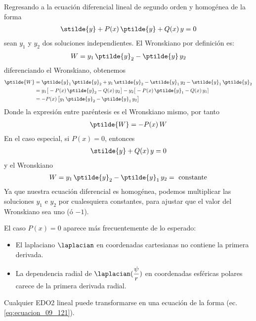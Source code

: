 Regresando a la ecuación diferencial lineal de segundo orden y homogénea de la forma
\begin{align}
\stilde{y} + P(x) \, \ptilde{y} + Q(x) \, y = 0
\label{eq:ecuacion_09_118}
\end{align}
sean $y_{1}$ y $y_{2}$ dos soluciones independientes. El Wronskiano por definición es:
\begin{align}
W = y_{1} \, \ptilde{y}_{2} - \ptilde{y} \, y_{2}
\label{eq:ecuacion_09_119}
\end{align}
diferenciando el Wronskiano, obtenemos
\begin{align*}
\ptilde{W} &= \ptilde{y}_{1} \, \ptilde{y}_{2} + y_{1} \, \stilde{y}_{2} - \stilde{y}_{1} \, y_{2} - \stilde{y}_{1} \: \ptilde{y}_{2} \\
&= y_{1} \big[ - P(x) \, \ptilde{y}_{2} - Q(x) \, y_{2} \big] - y_{2} \big[ - P(x) \, \ptilde{y}_{1} - Q(x)  \, y_{1}] \\
&= - P(x) \, \big[ y_{1} \, \ptilde{y}_{2} - \ptilde{y}_{1} \, y_{2} \big]
\end{align*}
Donde la expresión entre paréntesis es el Wronskiano mismo, por tanto
\begin{align}
\ptilde{W} = - P(x) \, W
\label{eq:ecuacion_09_120}
\end{align}
En el caso especial, si $P(x) = 0$, entonces
\begin{align}
\stilde{y} + Q(x) \, y = 0
\label{eq:ecuacion_09_121}
\end{align}
y el Wronskiano
\begin{align}
W = y_{1} \, \ptilde{y}_{2} - \ptilde{y}_{1} \, y_{2} = \mbox{ constante}
\label{eq:ecuacion_09_1202}
\end{align}
Ya que nuestra ecuación diferencial es homogénea, podemos multiplicar las soluciones $y_{1}$ e $y_{2}$ por cualesquiera constantes, para ajustar que el valor del Wronskiano sea uno (ó $-1$).
\par
El caso $P(x) = 0$ aparece más frecuentemente de lo esperado:
\begin{itemize}
\item El laplaciano $\laplacian$ en coordenadas cartesianas no contiene la primera derivada.
\item La dependencia radial de $\laplacian (\dfrac{\psi}{r})$ en coordenadas esféricas polares carece de la primera derivada radial.
\end{itemize}
Cualquier EDO2 lineal puede transformarse en una ecuación de la forma (ec. \ref{eq:ecuacion_09_121}).
\par
